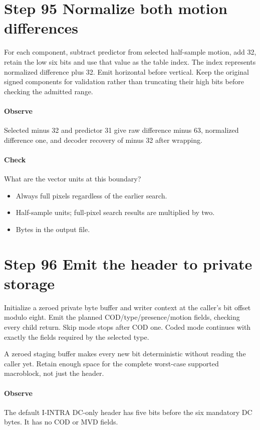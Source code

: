\section{Step 95 Normalize both motion differences}\label{h263-syntax-s05}
For each component, subtract predictor from selected half-sample motion, add
32, retain the low six bits and use that value as the table index. The index
represents normalized difference plus 32. Emit horizontal before vertical.
Keep the original signed components for validation rather than truncating their
high bits before checking the admitted range.

\paragraph{Observe} Selected minus 32 and predictor 31 give raw difference minus
63, normalized difference one, and decoder recovery of minus 32 after wrapping.
\paragraph{Check} What are the vector units at this boundary?
\begin{itemize}
  \item[A.] Always full pixels regardless of the earlier search.
  \item[B.] Half-sample units; full-pixel search results are multiplied by two.
  \item[C.] Bytes in the output file.
\end{itemize}

\section{Step 96 Emit the header to private storage}\label{h263-syntax-s06}
Initialize a zeroed private byte buffer and writer context at the caller's bit
offset modulo eight. Emit the planned COD/type/presence/motion fields, checking
every child return. Skip mode stops after COD one. Coded mode continues with
exactly the fields required by the selected type.

A zeroed staging buffer makes every new bit deterministic without reading the
caller yet. Retain enough space for the complete worst-case supported macroblock,
not just the header.

\paragraph{Observe} The default I-INTRA DC-only header has five bits before the
six mandatory DC bytes. It has no COD or MVD fields.
